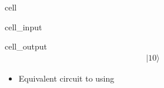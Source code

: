 \documentclass[letterpaper,10pt,english]{jupyterBook}
\begin{document}
\begin{sphinxuseclass}{cell}\begin{sphinxVerbatimInput}

\begin{sphinxuseclass}{cell_input}
\begin{sphinxVerbatim}[commandchars=\\\{\}]
\end{sphinxVerbatim}

\end{sphinxuseclass}\end{sphinxVerbatimInput}
\begin{sphinxVerbatimOutput}

\begin{sphinxuseclass}{cell_output}\begin{equation*}
\begin{split} |10\rangle\end{split}
\end{equation*}
\end{sphinxuseclass}\end{sphinxVerbatimOutput}

\end{sphinxuseclass}\begin{itemize}
\item {}
\sphinxAtStartPar
Equivalent circuit to  using 

\end{itemize}
\end{document}
